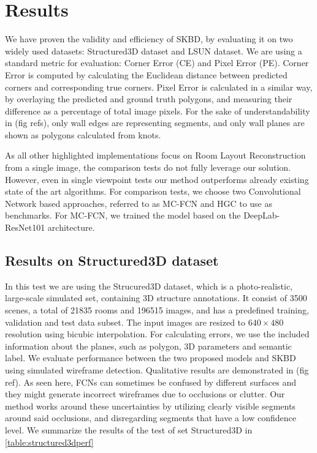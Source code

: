 \section{Results}
\label{sec:results}
We have proven the validity and efficiency of SKBD, by evaluating it on two widely used datasets: Structured3D dataset\cite{zheng2020structured3d} and LSUN dataset\cite{zhang2015large}. We are using a standard metric for evaluation: Corner Error (CE) and Pixel Error (PE). Corner Error is computed by calculating the Euclidean distance between predicted corners and corresponding true corners. Pixel Error is calculated in a similar way, by overlaying the predicted and ground truth polygons, and measuring their difference as a percentage of total image pixels. For the sake of understandability in (fig refs), only wall edges are representing segments, and only wall planes are shown as polygons calculated from knots.

As all other highlighted implementations\cite{8451365}\cite{10350607} focus on Room Layout Reconstruction from a single image, the comparison tests do not fully leverage our solution. However, even in single viewpoint tests our method outperforms already existing state of the art algorithms. For comparison tests, we choose two Convolutional Network based approaches, referred to as MC-FCN\cite{8451365} and HGC\cite{10350607} to use as benchmarks. For MC-FCN, we trained the model based on the DeepLab-ResNet101\cite{chen2017deeplab} architecture.


\subsection{Results on Structured3D dataset}
In this test we are using the Strucured3D dataset\cite{zheng2020structured3d}, which is a photo-realistic, large-scale simulated set, containing 3D structure annotations. It consist of 3500 scenes, a total of 21835 rooms and 196515 images, and has a predefined training, validation and test data subset. The input images are resized to \(640 \times 480 \) resolution using bicubic interpolation. For calculating errors, we use the included information about the planes, such as polygon, 3D parameters and semantic label. We evaluate performance between the two proposed models and SKBD using simulated wireframe detection. Qualitative results are demonstrated in (fig ref). As seen here, FCNs can sometimes be confused by different surfaces and they might generate incorrect wireframes due to occlusions or clutter. Our method works around these uncertainties by utilizing clearly visible segments around said occlusions, and disregarding segments that have a low confidence level. We summarize the results of the test of set Structured3D in \autoref{table:structured3dperf}

